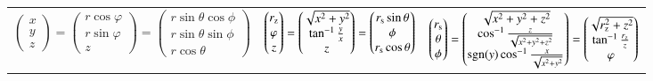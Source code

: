 {\begin{tabular}{c c c}
        $ 
        \begin{pmatrix}
            x \\ y \\ z
        \end{pmatrix} 
        =
        \begin{pmatrix}
            r \cos \varphi \\ r \sin \varphi \\ z
        \end{pmatrix}
        =
        \begin{pmatrix}
            r \sin \theta \cos \phi \\ r \sin \theta \sin \phi \\ r \cos \theta
        \end{pmatrix}
        $ &
        $ 
        \begin{pmatrix}
            r_{\rm z} \\ \varphi \\ z
        \end{pmatrix} 
        =
        \begin{pmatrix}
            \sqrt{x^2 + y^2} \\ \tan^{-1}\frac{y}{x} \\ z
        \end{pmatrix}
        =
        \begin{pmatrix}
            r_{\rm s} \sin \theta \\ \phi \\ r_{\rm s} \cos \theta
        \end{pmatrix}
        $ &
        $ 
        \begin{pmatrix}
            r_{\rm s} \\ \theta \\ \phi
        \end{pmatrix} 
        =
        \begin{pmatrix}
            \sqrt{x^2+y^2+z^2} \\ \cos^{-1} \frac{z}{\sqrt{x^2+y^2+z^2}} \\ \operatorname{sgn}(y) \cos^{-1} \frac{x}{\sqrt{x^2+y^2}}
        \end{pmatrix}
        =
        \begin{pmatrix}
            \sqrt{r_{\rm z}^2+z^2} \\ \tan^{-1}\frac{r_{\rm z}}{z} \\ \varphi
        \end{pmatrix}
        $ \\
    \end{tabular}
}

